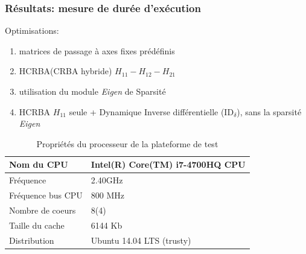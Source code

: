 \documentclass[10pt]{beamer}
\begin{document}
\begin{frame}\small
  \frametitle{Résultats: mesure de durée d'exécution}

  Optimisations:
	\begin{enumerate}
	\item matrices de passage à axes fixes prédéfinis
	\item HCRBA(CRBA hybride) $H_{11}-H_{12}-H_{21}$
	\item utilisation du module \emph{Eigen} de Sparsité
	\item HCRBA $H_{11}$ seule + Dynamique Inverse différentielle ($\mathrm{ID}_\delta$), sans la sparsité \emph{Eigen}
	\end{enumerate}
	
	
	\bigskip
	\begin{flushleft}
	\begin{footnotesize}
	
	\begin{table}[H]
	\begin{center}
	\begin{tabular}[H]{|l|l|}
	\hline
	Nom du CPU & Intel(R) Core(TM) i7-4700HQ CPU \\ \hline \hline
	Fréquence & 2.40GHz \\ \hline
	Fréquence bus CPU & 800 MHz \\ \hline
	Nombre de coeurs & 8(4) \\ \hline
	Taille du cache & 6144 Kb \\ \hline
	Distribution & Ubuntu 14.04 LTS (trusty) \\
	\hline
	\end{tabular}
	\caption[Table caption text]{Propriétés du processeur de la plateforme de test}
	\label{table:propriétésProc}
	\end{center}
	\end{table}
	
	\end{footnotesize}
	\end{flushleft}
	
\end{frame}
\end{document}
